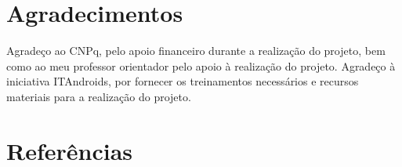 \documentclass[10pt,fleqn,a4paper]{article}
\begin{document}
	\section{Agradecimentos}
	
	Agradeço ao CNPq, pelo apoio financeiro durante a realização do projeto, bem como ao meu professor orientador pelo apoio à realização do projeto. Agradeço à iniciativa ITAndroids, por fornecer os treinamentos necessários e recursos materiais para a realização do projeto.
	
	\section{Referências}
	\nocite{Matlab}
	
	
	
    
\end{document}
